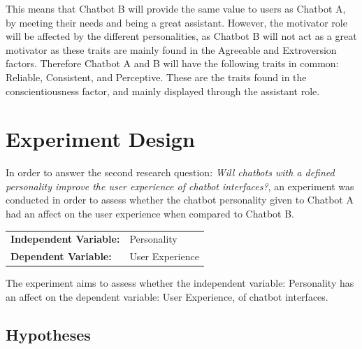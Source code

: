     This means that Chatbot B will provide the same value to users as Chatbot A, by meeting their needs and being a great assistant. However, the motivator role will be affected by the different personalities, as Chatbot B will not act as a great motivator as these traits are mainly found in the Agreeable and Extroversion factors. Therefore Chatbot A and B will have the following traits in common: Reliable, Consistent, and Perceptive. These are the traits found in the conscientiousness factor, and mainly displayed through the assistant role.

\vspace{5mm} %
    
\section{Experiment Design}
In order to answer the second research question: \textit{Will chatbots with a defined personality improve the user experience of chatbot interfaces?}, an experiment was conducted in order to assess whether the chatbot personality given to Chatbot A had an affect on the user experience when compared to Chatbot B.

\vspace{2,5mm}

\begin{tabular}{ l l }
    \textbf{Independent Variable:} & Personality \\ 
    \textbf{Dependent Variable:} & User Experience \\  
\end{tabular}
    
\vspace{2,5mm}
    
The experiment aims to assess whether the independent variable: Personality has an affect on the dependent variable: User Experience, of chatbot interfaces.

    \subsection{Hypotheses}
 
